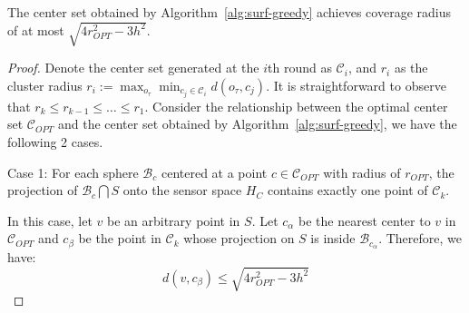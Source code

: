 \begin{proposition}
\label{prop:surf-algo1t}
The center set obtained by Algorithm~\ref{alg:surf-greedy} achieves coverage radius of at most
$\sqrt{4r_{OPT}^2 - 3h^2}$.
\vspace{-1mm}
\end{proposition}
\begin{proof}


Denote the center set generated at the 
$i$th round as $\mathcal{C}_{i}$, and $r_i$ as the cluster radius $r_i := \max_{o_\tau}\min_{c_j \in \mathcal{C}_i} d(o_\tau, c_j)$. It is straightforward to observe that $r_k\leq r_{k-1} \leq \dots \leq r_1$.
Consider the relationship between the optimal center set $\mathcal{C}_{OPT}$ and the center set obtained by Algorithm~\ref{alg:surf-greedy}, we have the following 2 cases.

Case 1: For each sphere $\mathcal{B}_{c}$ centered at a point $c\in\mathcal{C}_{OPT}$ with radius of $r_{OPT}$, the projection of $\mathcal{B}_{c}\bigcap S$ onto the sensor space $H_C$
contains exactly one point of $\mathcal{C}_k$. 


In this case, let $v$ be an arbitrary point in $S$. 
Let $c_{\alpha}$ be the nearest center to $v$ in $\mathcal{C}_{OPT}$ 
and $c_{\beta}$ be the point in $\mathcal{C}_k$ whose projection on $S$ is inside $\mathcal{B}_{c_{\alpha}}$. 
Therefore, we have: 
\begin{equation}
    d(v, c_\beta) 
    \leq 
    \sqrt{4r_{OPT}^2 - 3h^2}
\end{equation}


\end{proof}
